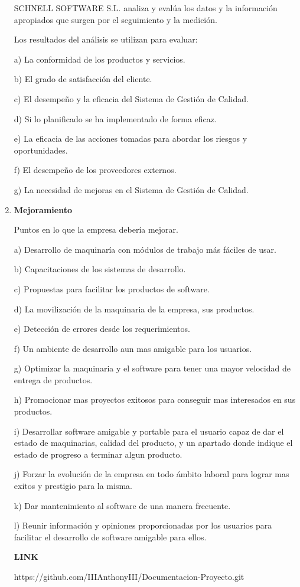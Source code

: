 \documentclass[10pt,a4paper]{article}
\begin{document}
\begin{enumerate}
SCHNELL SOFTWARE S.L. analiza y evalúa los datos y la información apropiados que surgen por el seguimiento y la
medición.

Los resultados del análisis se utilizan para evaluar:

a) La conformidad de los productos y servicios.

b) El grado de satisfacción del cliente.

c) El desempeño y la eficacia del Sistema de Gestión de Calidad.

d) Si lo planificado se ha implementado de forma eficaz.

e) La eficacia de las acciones tomadas para abordar los riesgos y oportunidades.

f) El desempeño de los proveedores externos.

g) La necesidad de mejoras en el Sistema de Gestión de Calidad.

\item \textbf{Mejoramiento}

Puntos en lo que la empresa debería mejorar.

a) Desarrollo de maquinaría con módulos de trabajo más fáciles de usar.

b) Capacitaciones de los sistemas de desarrollo.

c) Propuestas para facilitar los productos de software.

d) La movilización de la maquinaria de la empresa, sus productos.

e) Detección de errores desde los requerimientos. 

f) Un ambiente de desarrollo aun mas amigable para los usuarios.

g) Optimizar la maquinaria y el software para tener una mayor velocidad de entrega de productos.

h) Promocionar mas proyectos exitosos para conseguir mas interesados en sus productos.

i) Desarrollar software amigable y portable para el usuario capaz de dar el estado de maquinarias, calidad del producto, y un apartado donde indique el estado de progreso a terminar algun producto.

j) Forzar la evolución de la empresa en todo ámbito laboral para lograr mas exitos y prestigio para la misma.

k) Dar mantenimiento al software de una manera frecuente.

l) Reunir información y opiniones proporcionadas por los usuarios para facilitar el desarrollo de software amigable para ellos.

\textbf{LINK}

https://github.com/IIIAnthonyIII/Documentacion-Proyecto.git

\end{enumerate}
\end{document}
